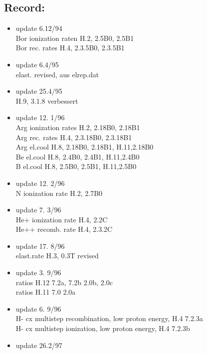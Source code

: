 \documentclass[12pt,dvips]{article}
\begin{document}
\subsection*{Record:}
\begin{itemize}
\item update  6.12/94 \\
   Bor ionization raten H.2, 2.5B0, 2.5B1 \\
                           Bor rec.   rates H.4, 2.3.5B0, 2.3.5B1 \\
 \item update  6.4/95 \\
  elast. revised, aus elrep.dat \\
 \item update  25.4/95 \\
  H.9, 3.1.8 verbessert   \\
 \item update 12. 1/96 \\
   Arg ionization rates H.2, 2.18B0, 2.18B1   \\
   Arg rec.   rates H.4, 2.3.18B0, 2.3.18B1 \\
   Arg el.cool      H.8, 2.18B0, 2.18B1, H.11,2.18B0\\
   Be  el.cool      H.8, 2.4B0, 2.4B1, H.11,2.4B0\\
   B   el.cool      H.8, 2.5B0, 2.5B1, H.11,2.5B0\\
 \item update 12. 2/96 \\
   N ionization rate H.2, 2.7B0 \\
 \item update  7. 3/96 \\
   He+ ionization rate H.4, 2.2C \\
   He++ recomb. rate H.4, 2.3.2C \\
 \item update  17. 8/96 \\
   elast.rate H.3, 0.3T revised
 \item update   3. 9/96 \\
   ratios H.12 7.2a, 7.2b 2.0b, 2.0c\\
   ratios H.11 7.0 2.0a
 \item update   6. 9/96 \\
   H- cx multistep recombination, low proton energy, H.4  7.2.3a\\
   H- cx multistep ionization, low proton energy, H.4  7.2.3b
 \item update   26.2/97 \\

\end{itemize}
\end{document}
